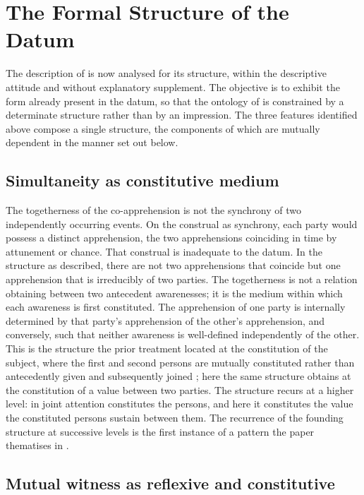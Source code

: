 \section{The Formal Structure of the Datum}
\label{p10:sec:structure}

\noindent
The description of  is now analysed for its structure, within the descriptive attitude and without explanatory supplement. The objective is to exhibit the form already present in the datum, so that the ontology of  is constrained by a determinate structure rather than by an impression. The three features identified above compose a single structure, the components of which are mutually dependent in the manner set out below.

\subsection{Simultaneity as constitutive medium}
\label{p10:sec:simultaneity}

The togetherness of the co-apprehension is not the synchrony of two independently occurring events. On the construal as synchrony, each party would possess a distinct apprehension, the two apprehensions coinciding in time by attunement or chance. That construal is inadequate to the datum. In the structure as described, there are not two apprehensions that coincide but one apprehension that is irreducibly of two parties. The togetherness is not a relation obtaining between two antecedent awarenesses; it is the medium within which each awareness is first constituted. The apprehension of one party is internally determined by that party's apprehension of the other's apprehension, and conversely, such that neither awareness is well-defined independently of the other. This is the structure the prior treatment located at the constitution of the subject, where the first and second persons are mutually constituted rather than antecedently given and subsequently joined \parencite{buber1970}; here the same structure obtains at the constitution of a value between two parties. The structure recurs at a higher level: in  joint attention constitutes the persons, and here it constitutes the value the constituted persons sustain between them. The recurrence of the founding structure at successive levels is the first instance of a pattern the paper thematises in .

\subsection{Mutual witness as reflexive and constitutive}
\label{p10:sec:witness}

